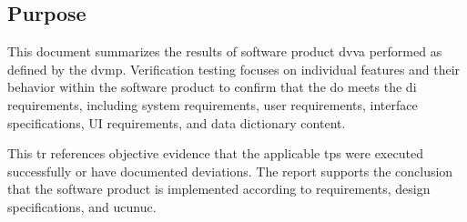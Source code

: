 \subsection{Purpose}
This document summarizes the results of software product \gls{dvva} performed as
defined by the \gls{dvmp}.  Verification testing focuses on individual features
and their behavior within the software product to confirm that the \gls{do}
meets the \gls{di} requirements, including system requirements, user
requirements, interface specifications, UI requirements, and data dictionary
content.

\tlcVspace

This \gls{tr} references objective evidence that the applicable \glspl{tp} were
executed successfully or have documented deviations.  The report supports the
conclusion that the software product is implemented according to requirements,
design specifications, and \gls{ucunuc}.
